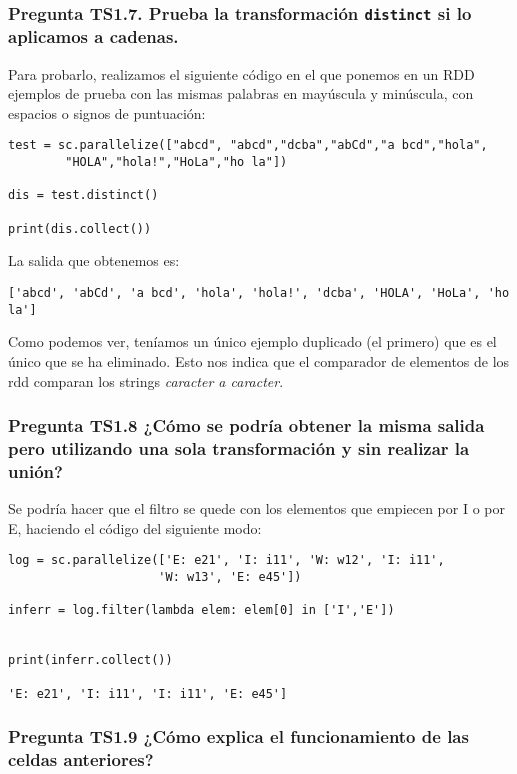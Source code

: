 \documentclass[11pt]{article}
\def\inline{\lstinline[basicstyle=\ttfamily,keywordstyle={}]}
\begin{document}
\subsubsection*{ Pregunta TS1.7. Prueba la transformación \inline{distinct} si lo aplicamos a cadenas.}

Para probarlo, realizamos el siguiente código en el que ponemos en un RDD ejemplos de prueba con las mismas palabras en mayúscula y minúscula, con espacios o signos de puntuación:

\begin{verbatim}
test = sc.parallelize(["abcd", "abcd","dcba","abCd","a bcd","hola",
        "HOLA","hola!","HoLa","ho la"])

dis = test.distinct()

print(dis.collect())
\end{verbatim}
La salida que obtenemos es:

\begin{verbatim}
['abcd', 'abCd', 'a bcd', 'hola', 'hola!', 'dcba', 'HOLA', 'HoLa', 'ho la']
\end{verbatim}

Como podemos ver, teníamos un único ejemplo duplicado (el primero) que es el único que se ha eliminado. Esto nos indica que el comparador de elementos de los rdd comparan los strings \emph{caracter a caracter}.

\subsubsection*{ Pregunta TS1.8 ¿Cómo se podría obtener la misma salida pero utilizando una sola transformación y sin realizar la unión?}


Se podría hacer que el filtro se quede con los elementos que empiecen por I o por E, haciendo el código del siguiente modo:

\begin{verbatim}
log = sc.parallelize(['E: e21', 'I: i11', 'W: w12', 'I: i11',
                     'W: w13', 'E: e45'])

inferr = log.filter(lambda elem: elem[0] in ['I','E'])


print(inferr.collect())

'E: e21', 'I: i11', 'I: i11', 'E: e45']

\end{verbatim}
\subsubsection*{ Pregunta TS1.9 ¿Cómo explica el funcionamiento de las celdas anteriores?}
\end{document}
